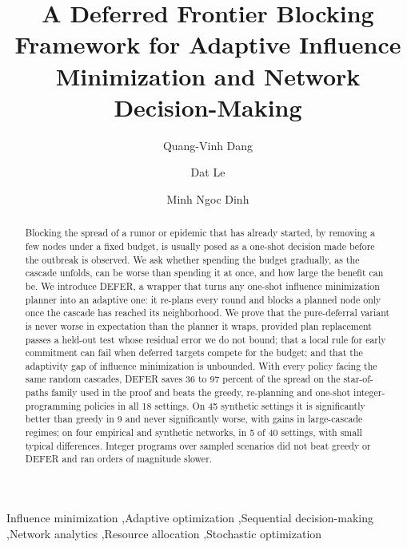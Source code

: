 \documentclass[preprint,11pt]{elsarticle}
\theoremstyle{definition}
\theoremstyle{remark}
\begin{document}
\begin{frontmatter}
\title{A Deferred Frontier Blocking Framework for Adaptive Influence Minimization and Network Decision-Making}
\author[a]{Quang-Vinh Dang}
\author[b]{Dat Le}
\author[c]{Minh Ngoc Dinh}

\begin{abstract}
Blocking the spread of a rumor or epidemic that has already started, by removing a few nodes under a fixed budget, is usually posed as a one-shot decision made before the outbreak is observed. We ask whether spending the budget gradually, as the cascade unfolds, can be worse than spending it at once, and how large the benefit can be. We introduce DEFER, a wrapper that turns any one-shot influence minimization planner into an adaptive one: it re-plans every round and blocks a planned node only once the cascade has reached its neighborhood. We prove that the pure-deferral variant is never worse in expectation than the planner it wraps, provided plan replacement passes a held-out test whose residual error we do not bound; that a local rule for early commitment can fail when deferred targets compete for the budget; and that the adaptivity gap of influence minimization is unbounded. With every policy facing the same random cascades, DEFER saves 36 to 97 percent of the spread on the star-of-paths family used in the proof and beats the greedy, re-planning and one-shot integer-programming policies in all 18 settings. On 45 synthetic settings it is significantly better than greedy in 9 and never significantly worse, with gains in large-cascade regimes; on four empirical and synthetic networks, in 5 of 40 settings, with small typical differences. Integer programs over sampled scenarios did not beat greedy or DEFER and ran orders of magnitude slower.
\end{abstract}

\begin{keyword}
Influence minimization \sep Adaptive optimization \sep Sequential decision-making \sep Network analytics \sep Resource allocation \sep Stochastic optimization
\end{keyword}
\end{frontmatter}
\end{document}
